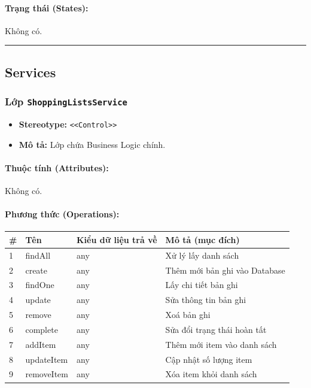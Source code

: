 \documentclass[12pt,a4paper]{article}
\begin{document}
\paragraph{Trạng thái (States):}
Không có.

\vskip 0.5cm
\noindent\rule{\textwidth}{0.5pt}
\vskip 0.5cm

\subsection{Services}

\subsubsection{Lớp \texttt{ShoppingListsService}}
\begin{itemize}[leftmargin=*]
    \item \textbf{Stereotype:} \texttt{\textless{}\textless{}Control\textgreater{}\textgreater{}}
    \item \textbf{Mô tả:} Lớp chứa Business Logic chính.
\end{itemize}

\paragraph{Thuộc tính (Attributes):}
Không có.

\paragraph{Phương thức (Operations):}
\begin{longtable}{|p{0.6cm}|p{3.8cm}|p{2.6cm}|p{6.5cm}|}
\hline
\textbf{\#} & \textbf{Tên} & \textbf{Kiểu dữ liệu trả về} & \textbf{Mô tả (mục đích)} \\ \hline
\endhead
1 & findAll & any & Xử lý lấy danh sách \\ \hline
2 & create & any & Thêm mới bản ghi vào Database \\ \hline
3 & findOne & any & Lấy chi tiết bản ghi \\ \hline
4 & update & any & Sửa thông tin bản ghi \\ \hline
5 & remove & any & Xoá bản ghi \\ \hline
6 & complete & any & Sửa đổi trạng thái hoàn tất \\ \hline
7 & addItem & any & Thêm mới item vào danh sách \\ \hline
8 & updateItem & any & Cập nhật số lượng item \\ \hline
9 & removeItem & any & Xóa item khỏi danh sách \\ \hline
\end{longtable}
\end{document}
